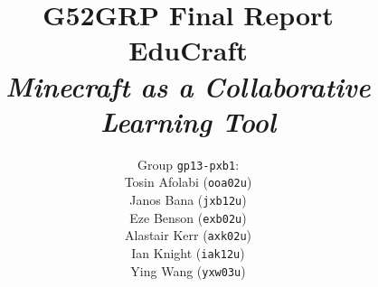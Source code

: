 \documentclass[11pt,a4paper]{report}
\begin{document}
\title{{\normalsize G52GRP Final Report}\\EduCraft\\\textit{Minecraft as a Collaborative Learning Tool}}
\author{Group \texttt{gp13-pxb1}:\\
            Tosin Afolabi (\texttt{ooa02u})\\
            Janos Bana (\texttt{jxb12u})\\
            Eze Benson (\texttt{exb02u})\\
            Alastair Kerr (\texttt{axk02u})\\
            Ian Knight (\texttt{iak12u})\\
            Ying Wang (\texttt{yxw03u})
            }
\maketitle

\tableofcontents








\appendix






\end{document}
